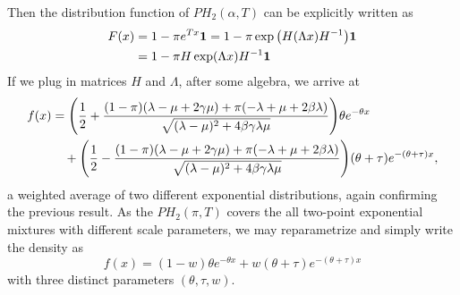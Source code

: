 \documentclass[11pt]{article}
\begin{document}
Then the distribution function of $PH_2(\alpha, T)$ can be explicitly written as
\begin{align}
\label{}
F(x)&=1-\pi e^{Tx}\mathbf{ 1}=  1-\pi \exp \big{(}H(\Lambda x)H^{-1}\big{)}\mathbf{ 1} \\
    & = 1-\pi H \exp (\Lambda x) H^{-1} \mathbf{ 1}
\end{align}
If we plug in matrices $H$ and $\Lambda$, after some algebra, we arrive at\\
\begin{align}
\label{}
    f(x)&=  \Bigg{(}\frac{1}{2}+\frac{(1-\pi)(\lambda-\mu+2\gamma \mu)+\pi(-\lambda+\mu +2\beta \lambda)}{\sqrt{(\lambda-\mu)^2+4\beta \gamma\lambda \mu}}\Bigg{)} \theta e^{-\theta x}\\
    &  \quad +\Bigg{(}\frac{1}{2}-\frac{(1-\pi)(\lambda-\mu+2\gamma \mu)+\pi(-\lambda+\mu +2\beta \lambda)}{\sqrt{(\lambda-\mu)^2+4\beta \gamma\lambda \mu}}\Bigg{)} (\theta+\tau) e^{-(\theta+\tau) x}, 
\end{align} a weighted average of two different exponential distributions, again confirming the previous result. As the $PH_2(\pi, T)$ covers the all two-point exponential mixtures with different scale parameters, we may reparametrize and simply write the density as
\begin{equation}
\label{f.case3}
f(x)=(1-w)\theta e^{-\theta x}+w(\theta+\tau) e^{-(\theta+\tau) x}
\end{equation} with three distinct parameters $(\theta, \tau, w)$.\\
\end{document}

